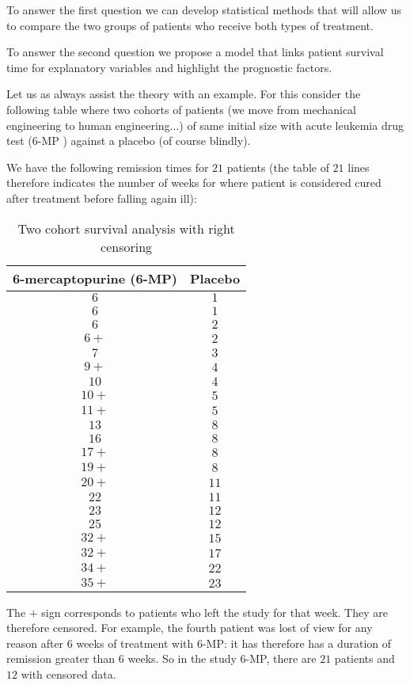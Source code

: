 	To answer the first question we can develop statistical methods that will allow us to compare the two groups of patients who receive both types of treatment.
	
	To answer the second question we propose a model that links patient survival time for explanatory variables and highlight the prognostic factors.
	
	Let us as always assist the theory with an example. For this consider the following table where two cohorts of patients (we move from mechanical engineering to human engineering...) of same initial size with acute leukemia drug test (6-MP ) against a placebo (of course blindly).
	
	We have the following remission times for $21$ patients (the table of $21$ lines therefore indicates the number of weeks for where patient is considered cured after treatment before falling again ill):
	\begin{table}[H]\centering
	\begin{center}
			\begin{tabular}{|c|c|}
				\hline
				\multicolumn{1}{c}{\cellcolor{black!30}\textbf{6-mercaptopurine (6-MP)}} & 
  \multicolumn{1}{c}{\cellcolor{black!30}\textbf{Placebo}} \\ \hline
				 $6$ & $1$ \\ \hline
				 $6$ & $1$ \\ \hline
				 $6$ & $2$ \\ \hline
				 $6+$ & $2$ \\ \hline
				 $7$ & $3$ \\ \hline
				 $9+$ & $4$ \\ \hline
				 $10$ & $4$ \\ \hline
				 $10+$ & $5$ \\ \hline
				 $11+$ & $5$ \\ \hline
				 $13$ & $8$ \\ \hline
				 $16$ & $8$ \\ \hline
				 $17+$ & $8$ \\ \hline
				 $19+$ & $8$ \\ \hline
				 $20+$ & $11$ \\ \hline
				 $22$ & $11$ \\ \hline
				 $23$ & $12$ \\ \hline
				 $25$ & $12$ \\ \hline
				 $32+$ & $15$ \\ \hline
				 $32+$ & $17$ \\ \hline
				 $34+$ & $22$ \\ \hline
				 $35+$ & $23$ \\ \hline
		\end{tabular}
	\end{center}
	\caption[]{Two cohort survival analysis with right censoring}
	\end{table}
	The $+$ sign corresponds to patients who left the study for that week. They are therefore censored. For example, the fourth patient was lost of view for any reason after $6$ weeks of treatment with 6-MP: it has therefore has a duration of remission greater than $6$ weeks. So in the study 6-MP, there are $21$ patients and $12$ with censored data.
	
